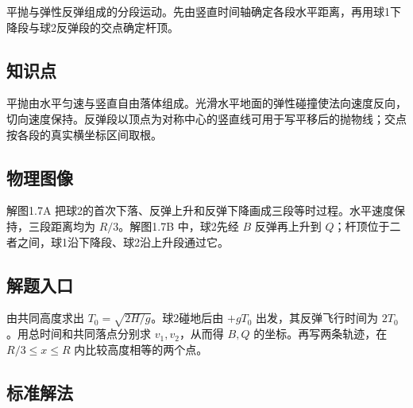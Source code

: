 \documentclass[UTF8,fontset=fandol,a4paper,11pt]{ctexart}
\begin{document}
平抛与弹性反弹组成的分段运动。先由竖直时间轴确定各段水平距离，再用球1下降段与球2反弹段的交点确定杆顶。



\subsection*{知识点}

平抛由水平匀速与竖直自由落体组成。光滑水平地面的弹性碰撞使法向速度反向，切向速度保持。反弹段以顶点为对称中心的竖直线可用于写平移后的抛物线；交点按各段的真实横坐标区间取根。




\subsection*{物理图像}

解图1.7A 把球2的首次下落、反弹上升和反弹下降画成三段等时过程。水平速度保持，三段距离均为 $R/3$。解图1.7B 中，球2先经 $B$ 反弹再上升到 $Q$；杆顶位于二者之间，球1沿下降段、球2沿上升段通过它。



\subsection*{解题入口}

由共同高度求出 $T_0=\sqrt{2H/g}$。球2碰地后由 $+gT_0$ 出发，其反弹飞行时间为 $2T_0$。用总时间和共同落点分别求 $v_1,v_2$，从而得 $B,Q$ 的坐标。再写两条轨迹，在 $R/3\leq x\leq R$ 内比较高度相等的两个点。



\subsection*{标准解法}
\end{document}
